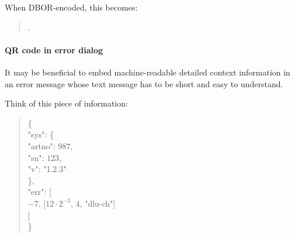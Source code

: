 \begin{BeginParPenalty}
    When DBOR-encoded, this becomes:
    \begin{quote}
        \ByteSequence{
            \DborFirstByteHex{Number}{26},
            \DborFirstByteHex{Sequence}{8A}, %
                \DborFirstByteHex{Number}{C8}, \DborNextByteHex{38},
                \DborFirstByteHex{Number}{04},
                \DborFirstByteHex{String}{66},
                    \DborNextByteHex{64}, \DborNextByteHex{6C}, \DborNextByteHex{75}, \DborNextByteHex{2D},
                    \DborNextByteHex{63}, \DborNextByteHex{68}
        }.
    \end{quote}
\end{BeginParPenalty}

\paragraph{QR code in error dialog}

It may be beneficial to embed machine-readable detailed context information in
an error message whose text message has to be short and easy to understand.

\begin{BeginParPenalty}
    Think of this piece of information:
    \begin{quote}
        \newcommand{\h}{\hspace*{\leftmargin}}
        \{ \\
            \h "sys": \{ \\
                \h\h "artno": $987$, \\
                \h\h "sn": $123$, \\
                \h\h "v": "1.2.3" \\
            \h \}, \\
            \h "err": [ \\
                \h\h $-7$, [$12 \cdot 2^{-3}$, $4$, "dlu-ch"] \\
            \h ] \\
        \}
    \end{quote}
\end{BeginParPenalty}

